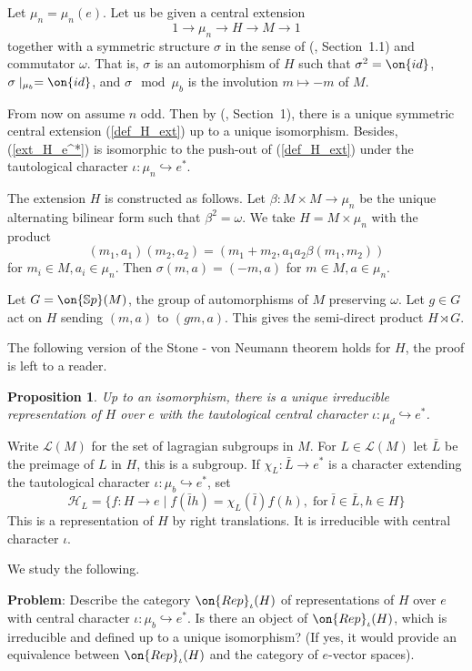 \documentclass[11pt]{amsart}
\newtheorem{Pp}[subsubsection]{Proposition}
\theoremstyle{definition}
\theoremstyle{remark}
\newcommand{\cH}{{\mathcal H}}
\newcommand{\cL}{{\mathcal L}}
\newcommand{\Rep}{{\on{Rep}}}
\newcommand{\hook}[1]{\stackrel{#1}{\hookrightarrow}}
\newcommand{\Sp}{\on{\mathbb{S}p}}
\newcommand{\id}{\on{id}}
\newcommand{\<}{\langle}
\renewcommand{\>}{\rangle}
\begin{document}
 Let $\mu_n=\mu_n(e)$. Let us be given a central extension 
\begin{equation}
\label{def_H_ext}
1\to \mu_n\to H\to M\to 1
\end{equation}
together with a symmetric structure $\sigma$ in the sense of (\cite{B}, Section~1.1) and commutator $\omega$. That is, $\sigma$ is an automorphism of $H$ such that $\sigma^2=\id$, $\sigma\mid_{\mu_b}=\id$, and $\sigma\mod \mu_b$ is the involution $m\mapsto -m$ of $M$. 

 From now on assume $n$ odd. Then by (\cite{P}, Section~1), there is a unique symmetric central extension (\ref{def_H_ext}) up to a unique isomorphism. Besides, (\ref{ext_H_e^*}) is isomorphic to the push-out of (\ref{def_H_ext}) under the tautological character $\iota: \mu_n\hook{} e^*$.
 
  The extension $H$ is constructed as follows. Let $\beta: M\times M\to \mu_n$ be the unique alternating bilinear form such that $\beta^2=\omega$. We take $H=M\times\mu_n$ with the product 
$$
(m_1, a_1)(m_2, a_2)=(m_1+m_2, a_1a_2\beta(m_1, m_2))
$$
for $m_i\in M, a_i\in \mu_n$. Then $\sigma(m,a)=(-m, a)$ for $m\in M, a\in\mu_n$.   

 Let $G=\Sp(M)$, the group of automorphisms of $M$ preserving $\omega$. Let $g\in G$ act on $H$ sending $(m,a)$ to $(gm, a)$. This gives the semi-direct product $H\rtimes G$. 

\sssec{}  The following version of the Stone - von Neumann theorem holds for $H$, the proof is left to a reader. 
\begin{Pp} Up to an isomorphism, there is a unique irreducible representation of $H$ over $e$ with the tautological central character $\iota: \mu_d\hook{} e^*$.
\end{Pp}

\sssec{} 
\label{Sect_2.0.4} Write $\cL(M)$ for the set of lagragian subgroups in $M$. For $L\in \cL(M)$ let $\bar L$ be the preimage of $L$ in $H$, this is a subgroup. If $\chi_L: \bar L\to e^*$ is a character extending the  
tautological character $\iota: \mu_b\hook{} e^*$, set
$$
\cH_L=\{f: H\to e\mid f(\bar l h)=\chi_L(\bar l)f(h),\; \mbox{for}\; \bar l\in\bar L, h\in H\}
$$
This is a representation of $H$ by right translations. It is irreducible with  central character $\iota$. 

\sssec{} 
\label{Sect_2.0.5}
We study the following.%

\medskip\noindent
{\bf Problem}: Describe the category $\Rep_{\iota}(H)$ of representations of $H$ over $e$ with central character $\iota: \mu_b\hook{} e^*$. Is there an object of $\Rep_{\iota}(H)$, which is irreducible and defined up to a unique isomorphism? (If yes, it would provide an equivalence between $\Rep_{\iota}(H)$ and the category of $e$-vector spaces).  
 
\end{document}
